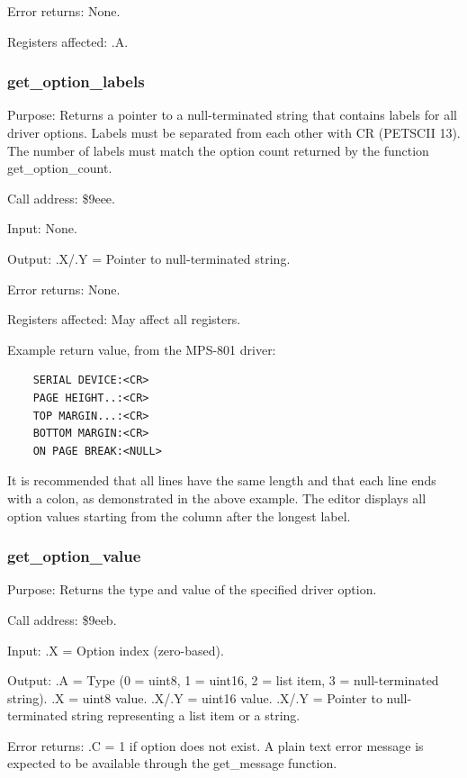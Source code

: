 \documentclass{article}
\begin{document}
            Error returns: None.

            Registers affected: .A.

        \subsubsection{get\_option\_labels}
            Purpose: Returns a pointer to a null-terminated string that
            contains labels for all driver options. Labels must be
            separated from each other with CR (PETSCII 13). The number
            of labels must match the option count returned by the
            function get\_option\_count.

            Call address: \$9eee.

            Input: None.

            Output: .X/.Y = Pointer to null-terminated string.

            Error returns: None.

            Registers affected: May affect all registers.

            Example return value, from the MPS-801 driver:
\begin{verbatim}
    SERIAL DEVICE:<CR>
    PAGE HEIGHT..:<CR>
    TOP MARGIN...:<CR>
    BOTTOM MARGIN:<CR>
    ON PAGE BREAK:<NULL>
\end{verbatim}

            It is recommended that all lines have the same length and
            that each line ends with a colon, as demonstrated in the
            above example. The editor displays all option values starting
            from the column after the longest label.

        \subsubsection{get\_option\_value}
            Purpose: Returns the type and value of the specified driver option.

            Call address: \$9eeb.

            Input: .X = Option index (zero-based).

            Output: .A = Type (0 = uint8, 1 = uint16, 2 = list item, 3 = null-terminated string). 
            .X = uint8 value.
            .X/.Y = uint16 value.
            .X/.Y = Pointer to null-terminated string representing a list item or a string.

            Error returns: .C = 1 if option does not exist. A plain text error message is 
            expected to be available through the get\_message function.
\end{document}
